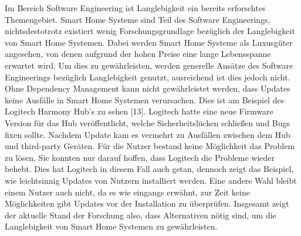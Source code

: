 Im Bereich Software Engineering ist Langlebigkeit ein bereits erforschtes Themengebiet. Smart Home Systeme sind Teil des
Software Engineerings, nichtsdestotrotz existiert wenig Forschungsgrundlage bezüglich der Langlebigkeit von Smart Home Systemen.
Dabei werden Smart Home Systeme als Luxusgüter angesehen, von denen aufgrund der hohen Preise eine lange Lebensspanne erwartet wird.
Um dies zu gewährleisten, werden generelle Ansätze des Software Engineerings bezüglich Langlebigkeit genutzt, ausreichend ist dies jedoch nicht.
Ohne Dependency Management kann nicht gewährleistet werden, dass Updates keine Ausfälle in Smart Home Systemen verursachen.
Dies ist am Beispiel des Logitech Harmony Hub's zu sehen [13]. Logitech hatte eine
neue Firmware Version für das Hub veröffentlicht, welche Sicherheitslücken schließen und Bugs fixen sollte.
Nachdem Update kam es vermehrt zu Ausfällen zwischen dem Hub und third-party Geräten. Für die Nutzer bestand keine Möglichkeit das Problem
zu lösen. Sie konnten nur darauf hoffen, dass Logitech die Probleme wieder behebt. Dies hat Logitech in diesem Fall auch getan,
dennoch zeigt das Beispiel, wie leichtsinnig Updates von Nutzern installiert werden. Eine andere Wahl bleibt einem Nutzer auch nicht, da 
es wie eingangs erwähnt, zur Zeit keine Möglichkeiten gibt Updates vor der Installation zu überprüfen.
Insgesamt zeigt der aktuelle Stand der Forschung also, dass Alternativen nötig sind, um die Langlebigkeit von Smart Home
Systemen zu gewährleisten.







